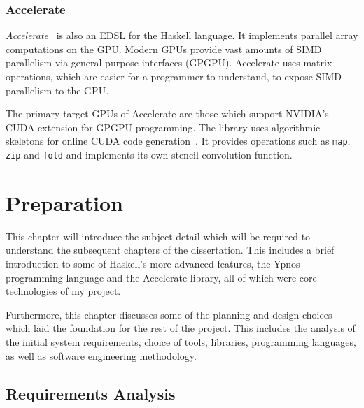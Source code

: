 \documentclass[12pt,a4paper,twoside]{scrbook}
\begin{document}
\subsection{Accelerate}

\emph{Accelerate}~\cite{acc-damp11} is also an EDSL for the Haskell language.
It implements parallel array computations on the GPU. Modern GPUs provide vast
amounts of SIMD parallelism via general purpose interfaces (GPGPU). Accelerate
uses matrix operations, which are easier for a programmer to understand, to
expose SIMD parallelism to the GPU.

The primary target GPUs of Accelerate are those which support NVIDIA's CUDA
extension for GPGPU programming. The library uses algorithmic skeletons for
online CUDA code generation~\cite{cole1989}. It provides operations such as
\texttt{map}, \texttt{zip} and \texttt{fold} and implements its own stencil
convolution function.


\chapter{Preparation}

This chapter will introduce the subject detail which will be required to
understand the subsequent chapters of the dissertation. This includes a brief
introduction to some of Haskell's more advanced features, the Ypnos programming
language and the Accelerate library, all of which were core technologies of my
project.

Furthermore, this chapter discusses some of the planning and design choices
which laid the foundation for the rest of the project. This includes the
analysis of the initial system requirements, choice of tools, libraries,
programming languages, as well as software engineering methodology.

\section{Requirements Analysis}

\newcommand{\low}{\ding{108}}
\newcommand{\medium}{\low\low}
\newcommand{\high}{\low\medium}

\newcommand{\mc}[1]{\multicolumn{2}{p{8cm}|}{#1}}
\newcommand{\stripe}[1]{\hline\multicolumn{5}{c}{#1}\\\hline}
\newcommand{\tblheaders}[1]{#1\\ \hline}
\newcommand{\tick}{\ding{52}}
\end{document}
